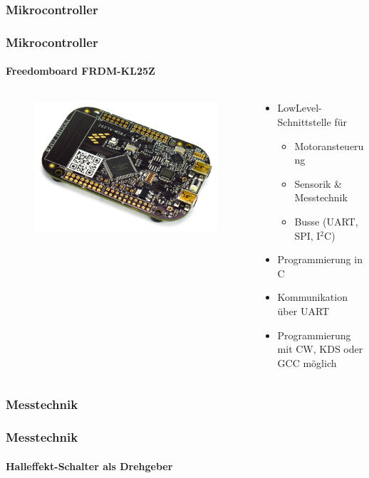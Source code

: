 \subsubsection{Mikrocontroller}
\begin{frame}
	\frametitle{Mikrocontroller\hfill{}\footnotesize \group}
	\framesubtitle{Freedomboard FRDM-KL25Z}
	\begin{columns}
		\begin{column}{0.5\textwidth}
			\begin{figure}
				\includegraphics[width=1\textwidth]{../../fig/frdm-kl25z.jpg}
			\end{figure}
		\end{column}
		\begin{column}{0.5\textwidth}
			\begin{itemize}
				\item LowLevel-Schnittstelle für
					\begin{itemize}
						\item Motoransteuerung
						\item Sensorik \& Messtechnik
						\item Busse (UART, SPI, I$^2$C)
					\end{itemize}
				\item Programmierung in C
				\item Kommunikation über UART
				\item Programmierung mit CW, KDS oder GCC möglich
			\end{itemize}
		\end{column}
	\end{columns}
\end{frame}

\subsubsection{Messtechnik}
\begin{frame}
	\frametitle{Messtechnik\hfill{}\footnotesize \group}
	\framesubtitle{Halleffekt-Schalter als Drehgeber}
\end{frame}
